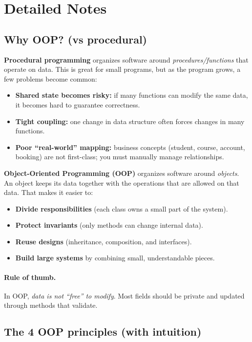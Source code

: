 \documentclass[11pt]{article}
\begin{document}
\section{Detailed Notes}
\subsection{Why OOP? (vs procedural)}
\textbf{Procedural programming} organizes software around \emph{procedures/functions} that operate on data.
This is great for small programs, but as the program grows, a few problems become common:
\begin{itemize}
  \item \textbf{Shared state becomes risky:} if many functions can modify the same data, it becomes hard to guarantee correctness.
  \item \textbf{Tight coupling:} one change in data structure often forces changes in many functions.
  \item \textbf{Poor ``real-world'' mapping:} business concepts (student, course, account, booking) are not first-class; you must manually manage relationships.
\end{itemize}

\textbf{Object-Oriented Programming (OOP)} organizes software around \emph{objects}.
An object keeps its data together with the operations that are allowed on that data.
That makes it easier to:
\begin{itemize}
  \item \textbf{Divide responsibilities} (each class owns a small part of the system).
  \item \textbf{Protect invariants} (only methods can change internal data).
  \item \textbf{Reuse designs} (inheritance, composition, and interfaces).
  \item \textbf{Build large systems} by combining small, understandable pieces.
\end{itemize}

\paragraph{Rule of thumb.} In OOP, \emph{data is not ``free'' to modify}. Most fields should be private and updated through methods that validate.

\subsection{The 4 OOP principles (with intuition)}
\end{document}
